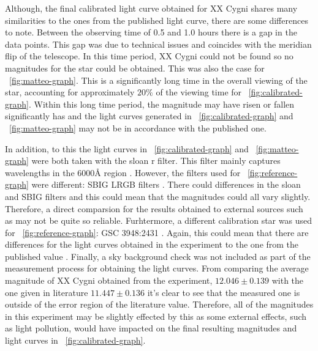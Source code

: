 \documentclass{article}
\newcommand{\figref}[2][\figurename~]{#1\ref{#2}}
\begin{document}
\vspace{2mm}
\noindent
Although, the final calibrated light curve obtained for XX Cygni shares many similarities to the ones from the published light curve, there are some differences to note. Between the observing time of 0.5 and 1.0 hours there is a gap in the data points. This gap was due to technical issues and coincides with the meridian flip of the telescope. In this time period, XX Cygni could not be found so no magnitudes for the star could be obtained. This was also the case for \figref{fig:matteo-graph}. This is a significantly long time in the overall viewing of the star, accounting for approximately $20\%$ of the viewing time for \figref{fig:calibrated-graph}. Within this long time period, the magnitude may have risen or fallen significantly has and the light curves generated in \figref{fig:calibrated-graph} and \figref{fig:matteo-graph} may not be in accordance with the published one.

\vspace{2mm}
\noindent
In addition, to this the light curves in \figref{fig:calibrated-graph} and \figref{fig:matteo-graph} were both taken with the sloan r filter. This filter mainly captures wavelengths in the 6000{\AA} region \cite{Paper01}. However, the filters used for \figref{fig:reference-graph} were different: SBIG LRGB filters \cite{Web04}. There could differences in the sloan and SBIG filters and this could mean that the magnitudes could all vary slightly. Therefore, a direct comparsion for the results obtained to external sources such as \cite{Web04} may not be quite so reliable. Furhtermore, a different calibration star was used for \figref{fig:reference-graph}: GSC 3948:2431 \cite{Web04}. Again, this could mean that there are differences for the light curves obtained in the experiment to the one from the published value \cite{Web04}. Finally, a sky background check was not included as part of the measurement process for obtaining the light curves. From comparing the average magnitude of XX Cygni obtained from the experiment, $12.046 \pm{0.139}$ with the one given in literature $11.447 \pm{0.136}$ \cite{Web03} it's clear to see that the measured one is outside of the error region of the literature value. Therefore, all of the magnitudes in this experiment may be slightly effected by this as some external effects, such as light pollution, would have impacted on the final resulting magnitudes and light curves in \figref{fig:calibrated-graph}.

\end{document}

